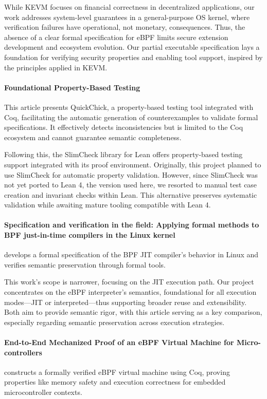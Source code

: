 \documentclass[sigconf]{acmart}
\begin{document}
While KEVM focuses on financial correctness in decentralized applications, our work addresses system-level guarantees in a general-purpose OS kernel, where verification failures have operational, not monetary, consequences. Thus, the absence of a clear formal specification for eBPF limits secure extension development and ecosystem evolution. Our partial executable specification lays a foundation for verifying security properties and enabling tool support, inspired by the principles applied in KEVM.

\paragraph{Foundational Property-Based Testing}\cite{paraskevopoulou2015foundational} This article presents QuickChick, a property-based testing tool integrated with Coq, facilitating the automatic generation of counterexamples to validate formal specifications. It effectively detects inconsistencies but is limited to the Coq ecosystem and cannot guarantee semantic completeness.

Following this, the SlimCheck library \cite{slimcheck2023} for Lean offers property-based testing support integrated with its proof environment. Originally, this project planned to use SlimCheck for automatic property validation. However, since SlimCheck was not yet ported to Lean 4, the version used here, we resorted to manual test case creation and invariant checks within Lean. This alternative preserves systematic validation while awaiting mature tooling compatible with Lean 4.

\paragraph{Specification and verification in the field: Applying formal methods to BPF just-in-time compilers in the Linux kernel} \cite{nelson2020specification} develops a formal specification of the BPF JIT compiler's behavior in Linux and verifies semantic preservation through formal tools.

This work’s scope is narrower, focusing on the JIT execution path. Our project concentrates on the eBPF interpreter's semantics, foundational for all execution modes—JIT or interpreted—thus supporting broader reuse and extensibility. Both aim to provide semantic rigor, with this article serving as a key comparison, especially regarding semantic preservation across execution strategies.

\paragraph{End-to-End Mechanized Proof of an eBPF Virtual Machine for Micro-controllers} \cite{yuan2022endMicro} constructs a formally verified eBPF virtual machine using Coq, proving properties like memory safety and execution correctness for embedded microcontroller contexts.
\end{document}
